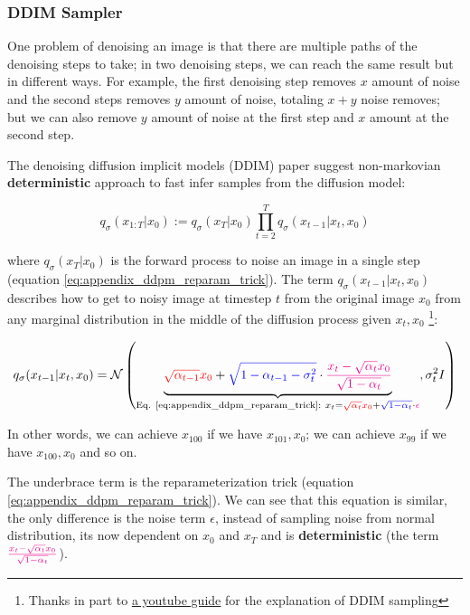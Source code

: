 \subsubsection{DDIM Sampler}

One problem of denoising an image is that there are multiple paths of the denoising steps to take; in two denoising steps, we can reach the same result but in different ways. For example, the first denoising step removes $x$ amount of noise and the second steps removes $y$ amount of noise, totaling $x+y$ noise removes; but we can also remove $y$ amount of noise at the first step and $x$ amount at the second step.

The denoising diffusion implicit models (DDIM) paper \cite{ddim} suggest non-markovian \textbf{deterministic} approach to fast infer samples from the diffusion model:

\[ q_\sigma (x_{1:T} | x_0) := q_\sigma (x_T | x_0) \prod_{t=2}^{T} q_\sigma (x_{t-1} | x_t, x_0)\]

where $q_\sigma (x_T | x_0)$ is the forward process to noise an image in a single step (equation \ref{eq:appendix_ddpm_reparam_trick}). The term $q_\sigma (x_{t-1} | x_t, x_0)$ describes how to get to noisy image at timestep $t$ from the original image $x_0$ from any marginal distribution in the middle of the diffusion process given $x_t, x_0$ \footnote{Thanks in part to \href{https://www.youtube.com/watch?v=r4V0vLhYZIQ&t=686s}{a youtube guide} for the explanation of DDIM sampling}:

\begin{equation}
q_\sigma (x_{t-1} | x_t, x_0) = \mathcal{N} \left( 
\underbrace{
    \textcolor{red}{\sqrt{\alpha_{t-1}} x_0} + \textcolor{blue}{\sqrt{1 - \alpha_{t-1} - \sigma_t^2}} \cdot \textcolor{magenta}{\frac{x_t - \sqrt{\alpha_t} x_0}{\sqrt{1 - \alpha_t}}}
}_{
    \text{Eq. \ref{eq:appendix_ddpm_reparam_trick}:}\ x_t = \textcolor{red}{\sqrt{\alpha_t} x_0} + \textcolor{blue}{\sqrt{1 - \alpha_t}} \cdot \textcolor{magenta}{\epsilon}
}, \sigma_t^2 I 
\right)
\label{eq:appendix_ddim_q}
\end{equation}

In other words, we can achieve $x_100$ if we have $x_101, x_0$; we can achieve $x_99$ if we have $x_100, x_0$ and so on.

The underbrace term is the reparameterization trick (equation \ref{eq:appendix_ddpm_reparam_trick}). We can see that this equation is similar, the only difference is the noise term $\epsilon$, instead of sampling noise from normal distribution, its now dependent on $x_0$ and $x_T$ and is \textbf{deterministic} (the term $\textcolor{magenta}{\frac{x_t - \sqrt{\alpha_t} x_0}{\sqrt{1 - \alpha_t}}}$).

